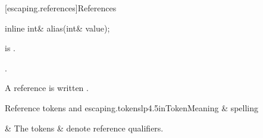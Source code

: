 [escaping.references]{References}

%
\begin{itemdecl}
inline int& alias(int& value);
\end{itemdecl}

\begin{itemdescr}
\pnum
\mandates
{} is .

\pnum
\returns
{}.

\pnum
\remarks
A reference is written .
\begin{libtab2}{Reference tokens \tcode{\&} and \tcode{\&\&}}{escaping.tokens}{lp{4.5in}}{Token}{Meaning \& spelling}

\tcode{\&\&} &
The tokens \tcode{\&} \& \tcode{\&\&} denote reference qualifiers. \\
\end{libtab2}
\end{itemdescr}
